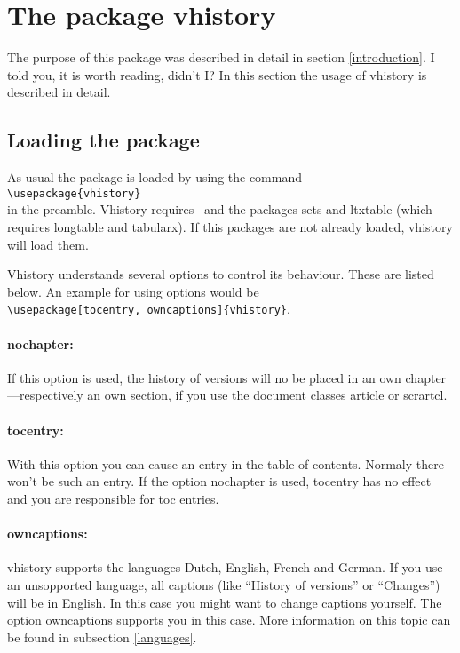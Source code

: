 \section{The package vhistory}

The purpose of this package was described in detail in section \ref{introduction}.
I told you, it is worth reading, didn't I? In this section the usage of vhistory is described in detail.

\subsection{Loading the package}\label{load}
As usual the package is loaded by using the command\\
\mbox{}\hspace{2em}\verb|\usepackage{vhistory}|\\
in the preamble. Vhistory requires \LaTeXe\ and the packages sets and ltxtable (which requires longtable and tabularx). If this packages are not already loaded, vhistory will load them.

Vhistory understands several options to control its behaviour. These are listed below. An example for using options would be\\
\mbox{}\hspace{2em}\verb|\usepackage[tocentry, owncaptions]{vhistory}|.

\paragraph{nochapter:} If this option is used, the history of versions will no be placed in an own chapter---respectively an own section, if you use the document classes article or scrartcl.

\paragraph{tocentry:} With this option you can cause an entry in the table of contents. Normaly there won't be such an entry. If the option nochapter is used, tocentry has no effect and you are responsible for toc entries.

\paragraph{owncaptions:} vhistory supports the languages Dutch, English, French and German. If you use an unsopported language, all captions (like ``History of versions'' or ``Chan\-ges'') will be in English. In this case you might want to change captions yourself. The option own\-capt\-ions supports you in this case. More information on this topic can be found in subsection \ref{languages}.


